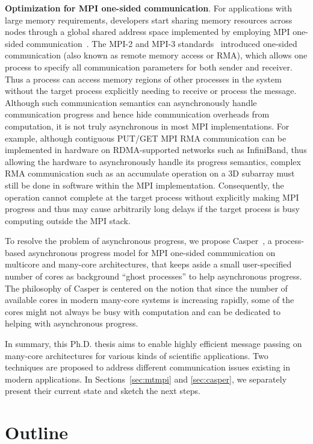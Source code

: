 \vspace{0.2ex}
\noindent\textbf{Optimization for MPI one-sided communication}.  For
applications with large memory requirements, developers start sharing
memory resources across nodes through a global shared address space
implemented by employing MPI one-sided
communication~\cite{dinan12:armci_mpi}.  The MPI-2 and MPI-3
standards~\cite{mpi30-report} introduced one-sided communication (also
known as remote memory access or RMA), which allows one process to
specify all communication parameters for both sender and receiver.
Thus a process can access memory regions of other processes in the
system without the target process explicitly needing to receive or
process the message. Although such communication semantics can
asynchronously handle communication progress and hence hide
communication overheads from computation, it is not truly asynchronous
in most MPI implementations. For example, although contiguous PUT/GET
MPI RMA communication can be implemented in hardware on RDMA-supported
networks such as InfiniBand, thus allowing the hardware to
asynchronously handle its progress semantics, complex RMA
communication such as an accumulate operation on a 3D subarray must
still be done in software within the MPI implementation.
Consequently, the operation cannot complete at the target process
without explicitly making MPI progress and thus may cause arbitrarily
long delays if the target process is busy computing outside the MPI
stack.

To resolve the problem of asynchronous progress, we propose
Casper~\cite{casper}, a process-based asynchronous progress model for
MPI one-sided communication on multicore and many-core architectures,
that keeps aside a small user-specified number of cores as background
``ghost processes'' to help asynchronous progress. The philosophy of
Casper is centered on the notion that since the number of available
cores in modern many-core systems is increasing rapidly, some of the
cores might not always be busy with computation and can be dedicated
to helping with asynchronous progress.

In summary, this Ph.D. thesis aims to enable highly efficient message
passing on many-core architectures for various kinds of scientific
applications. Two techniques are proposed to address different
communication issues existing in modern applications.  In
Sections~\ref{sec:mtmpi} and \ref{sec:casper}, we separately present
their current state and sketch the next steps.

\section{Outline}
